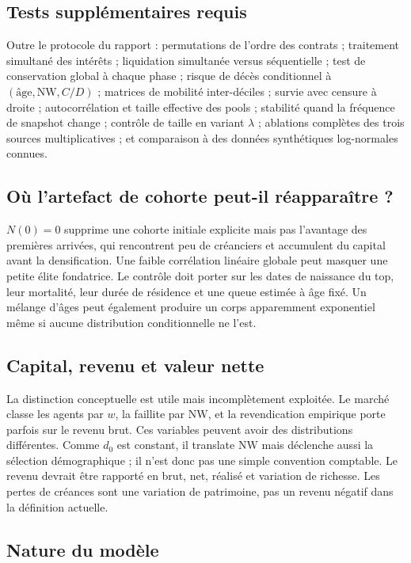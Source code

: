 \documentclass[11pt,a4paper]{article}
\newcommand{\NW}{\mathrm{NW}}
\begin{document}
\subsection{Tests supplémentaires requis}

Outre le protocole du rapport : permutations de l'ordre des contrats ; traitement
simultané des intérêts ; liquidation simultanée versus séquentielle ; test de
conservation global à chaque phase ; risque de décès conditionnel à $(\text{âge},
\NW,C/D)$ ; matrices de mobilité inter-déciles ; survie avec censure à droite ;
autocorrélation et taille effective des pools ; stabilité quand la fréquence de
snapshot change ; contrôle de taille en variant $\lambda$ ; ablations complètes
des trois sources multiplicatives ; et comparaison à des données synthétiques
log-normales connues.

\subsection{Où l'artefact de cohorte peut-il réapparaître ?}

$N(0)=0$ supprime une cohorte initiale explicite mais pas l'avantage des premières
arrivées, qui rencontrent peu de créanciers et accumulent du capital avant la
densification. Une faible corrélation linéaire globale peut masquer une petite
élite fondatrice. Le contrôle doit porter sur les dates de naissance du top,
leur mortalité, leur durée de résidence et une queue estimée à âge fixé. Un
mélange d'âges peut également produire un corps apparemment exponentiel même si
aucune distribution conditionnelle ne l'est.

\subsection{Capital, revenu et valeur nette}

La distinction conceptuelle est utile mais incomplètement exploitée. Le marché
classe les agents par $w$, la faillite par $\NW$, et la revendication empirique
porte parfois sur le revenu brut. Ces variables peuvent avoir des distributions
différentes. Comme $d_0$ est constant, il translate $\NW$ mais déclenche aussi la
sélection démographique ; il n'est donc pas une simple convention comptable. Le
revenu devrait être rapporté en brut, net, réalisé et variation de richesse. Les
pertes de créances sont une variation de patrimoine, pas un revenu négatif dans
la définition actuelle.

\subsection{Nature du modèle}
\end{document}
